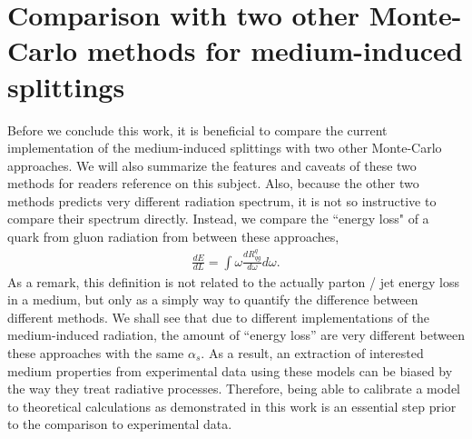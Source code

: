 \documentclass[aps, prc, reprint, amsmath, groupedaddress, nofootinbib]{revtex4-1}
\begin{document}
\section{Comparison with two other Monte-Carlo methods for medium-induced splittings}\label{section:compare}
Before we conclude this work, it is beneficial to compare the current implementation of the medium-induced splittings with two other Monte-Carlo approaches.
We will also summarize the features and caveats of these two methods for readers reference on this subject. 
Also, because the other two methods predicts very different radiation spectrum, it is not so instructive to compare their spectrum directly.
Instead, we compare the ``energy loss" of a quark from gluon radiation from between these approaches,
\begin{eqnarray}
\frac{dE}{dL} = \int \omega \frac{dR^q_{qg}}{d\omega} d\omega.
\label{eq:eloss}
\end{eqnarray}
As a remark, this definition is not related to the actually parton / jet energy loss in a medium, but only as a simply way to quantify the difference between different methods.
We shall see that due to different implementations of the medium-induced radiation, the amount of ``energy loss'' are very different between these approaches with the same $\alpha_s$.
As a result, an extraction of interested medium properties from experimental data using these models can be biased by the way they treat radiative processes.
Therefore, being able to calibrate a model to theoretical calculations as demonstrated in this work is an essential step prior to the comparison to experimental data.
\end{document}
